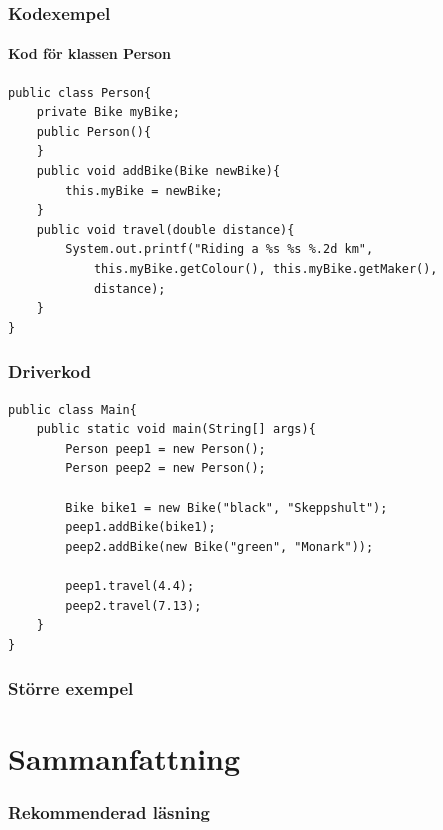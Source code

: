 \documentclass[aspectratio=169]{beamer}
\begin{document}
\begin{frame}[fragile]
    \frametitle{Kodexempel}
    \framesubtitle{Kod för klassen Person}

    \begin{lstlisting}
public class Person{
    private Bike myBike;
    public Person(){
    }
    public void addBike(Bike newBike){
        this.myBike = newBike;
    }
    public void travel(double distance){
        System.out.printf("Riding a %s %s %.2d km", 
            this.myBike.getColour(), this.myBike.getMaker(), 
            distance);    
    }
}
    \end{lstlisting}
\end{frame}

\begin{frame}[fragile]
    \frametitle{Driverkod}

    \begin{lstlisting}
public class Main{
    public static void main(String[] args){
        Person peep1 = new Person();
        Person peep2 = new Person();

        Bike bike1 = new Bike("black", "Skeppshult");
        peep1.addBike(bike1);
        peep2.addBike(new Bike("green", "Monark"));

        peep1.travel(4.4);
        peep2.travel(7.13);
    }
}
    \end{lstlisting}
\end{frame}

\begin{frame}
    \frametitle{Större exempel}

\end{frame}

\section{Sammanfattning}

\begin{frame}
    \frametitle{Rekommenderad läsning}


\end{frame}
\end{document}
